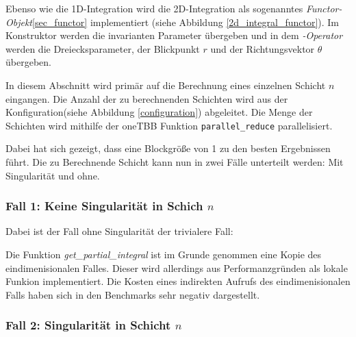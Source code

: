 Ebenso wie die 1D-Integration wird die 2D-Integration als sogenanntes \textit{Functor-Objekt}\ref{sec_functor} implementiert (siehe Abbildung \ref{2d_integral_functor}). 
Im Konstruktor werden die invarianten Parameter übergeben und in dem \textit{\(\)-Operator} werden die Dreiecksparameter, der Blickpunkt $r$ und der Richtungsvektor $\theta$ übergeben.

In diesem Abschnitt wird primär auf die Berechnung eines einzelnen Schicht $n$ eingangen. Die Anzahl der zu berechnenden Schichten wird aus der Konfiguration(siehe Abbildung \ref{configuration}) abgeleitet. 
Die Menge der Schichten wird mithilfe der oneTBB Funktion \texttt{parallel\_reduce} parallelisiert.

\begin{center}
    
    \label{2d_integral_parallel}
\end{center}

Dabei hat sich gezeigt, dass eine Blockgröße von 1 zu den besten Ergebnissen führt.
Die zu Berechnende Schicht kann nun in zwei Fälle unterteilt werden: Mit Singularität und ohne.

\subsubsection*{Fall 1: Keine Singularität in Schich $n$}

Dabei ist der Fall ohne Singularität der trivialere Fall:

\begin{center}
    
    \label{2d_integral_trivial}
\end{center}


Die Funktion \textit{get\_partial\_integral} ist im Grunde genommen eine Kopie des eindimenisionalen Falles. Dieser wird allerdings aus Performanzgründen als lokale Funkion implementiert.
Die Kosten eines indirekten Aufrufs des eindimenisionalen Falls haben sich in den Benchmarks sehr negativ dargestellt.


\subsubsection*{Fall 2: Singularität in Schicht $n$}

